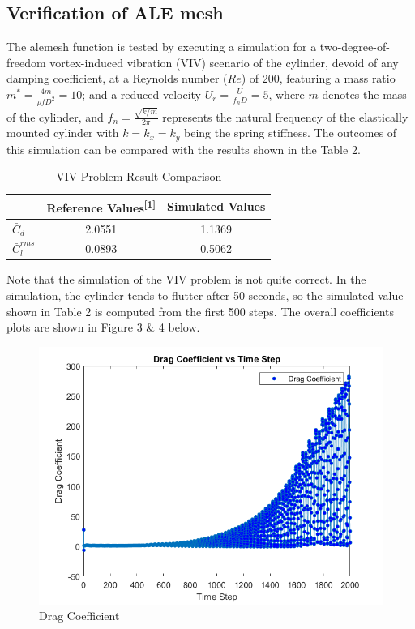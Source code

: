 \documentclass[a4paper,12pt]{article} %
\begin{document}
\subsection*{Verification of ALE mesh}
The alemesh function is tested by executing a simulation for a two-degree-of-freedom vortex-induced vibration (VIV)
 scenario of the cylinder, devoid of any damping coefficient, at a Reynolds number (\(Re\)) of 200, featuring a 
 mass ratio \(m^* = \frac{4m}{\rho f D^2} = 10\); and a reduced velocity \(U_r = \frac{U}{f_n D} = 5\), where 
 \(m\) denotes the mass of the cylinder, and \(f_n = \frac{\sqrt{k/m}}{2\pi}\) represents the natural frequency 
 of the elastically mounted cylinder with \(k = k_x = k_y\) being the spring stiffness. The outcomes of this 
 simulation can be compared with the results shown in the Table 2. 
 \begin{table}[ht]
    \centering
    \caption{VIV Problem Result Comparison}
    \begin{tabular}{|l|c|c|}
      \hline
      \rule{0pt}{15pt}
       & Reference Values\textsuperscript{[1]} & Simulated Values \\
      \hline
      \rule{0pt}{15pt}
      $\bar C_d$ & 2.0551 & 1.1369 \\
      \hline
      \rule{0pt}{15pt}
      $\bar C_l^{rms}$ & 0.0893 & 0.5062\\
      \hline
    \end{tabular}
  \end{table}
Note that the simulation of the VIV problem is not quite correct. In the simulation, the cylinder tends to flutter
after 50 seconds, so the simulated value shown in Table 2 is computed from the first 500 steps. The overall coefficients
plots are shown in Figure 3 \& 4 below.
  \begin{figure}[htbp]
    \center
    \includegraphics[scale=0.6]{Cd_1.png}
    \caption{Drag Coefficient}
\end{figure}
\end{document}
